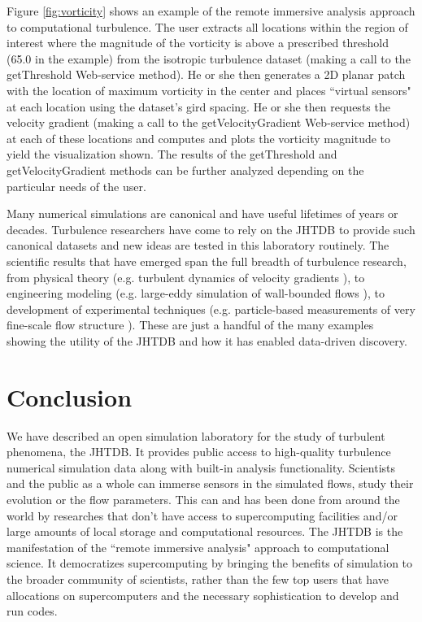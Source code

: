 \documentclass[10pt,twocolumn]{article}
\begin{document}
Figure \ref{fig:vorticity} shows an example of the remote immersive analysis approach to computational turbulence. The user extracts all locations within the
region of interest where the magnitude of the vorticity is above a prescribed threshold (65.0 in the example) from the isotropic turbulence dataset (making 
a call to the getThreshold Web-service method). He or she then generates a 2D planar patch with the location of maximum vorticity in the center and places
``virtual sensors" at each location using the dataset's gird spacing. He or she then requests the velocity gradient (making a call to the getVelocityGradient
Web-service method) at each of these locations and computes and plots the vorticity magnitude to yield the visualization shown. The results of the 
getThreshold and getVelocityGradient methods can be further analyzed depending on the particular needs of the user.

Many numerical simulations are canonical and have useful lifetimes of years or decades. Turbulence researchers have come to rely on the JHTDB to 
provide such canonical datasets and new ideas are tested in this laboratory routinely. The scientific results that have emerged span the full breadth of 
turbulence research, from physical theory (e.g. turbulent dynamics of velocity gradients \cite{luethi2009expanding}), to engineering modeling 
(e.g. large-eddy simulation of wall-bounded flows \cite{gungor2010new}), to development of experimental techniques 
(e.g. particle-based measurements of very fine-scale flow structure \cite{lawson2014scanning}).
These are just a handful of the many examples showing the utility of the 
JHTDB and how it has enabled data-driven discovery.

\section{Conclusion}
We have described an open simulation laboratory for the study of turbulent phenomena, the JHTDB. It provides public access to high-quality turbulence 
numerical simulation data along with built-in analysis functionality. Scientists and the public as a whole can immerse sensors in the simulated flows, study
their evolution or the flow parameters. This can and has been done from around the world by researches that don't have access to supercomputing facilities
and/or large amounts of local storage and computational resources. The JHTDB is the manifestation of the ``remote immersive analysis" approach to 
computational science. It democratizes supercomputing by bringing the benefits of simulation to the broader community of scientists, rather than the
few top users that have allocations on supercomputers and the necessary sophistication to develop and run codes.
\end{document}
